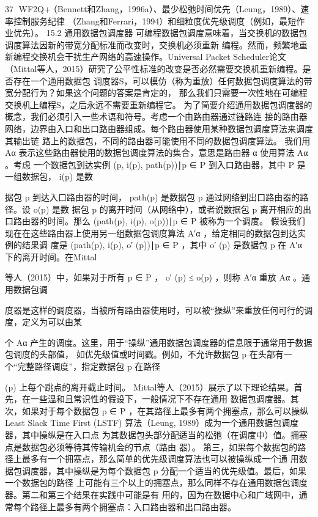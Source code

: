                                                     37
WF2Q+）（Bennett和Zhang，1996a）、最少松弛时间优先（Leung，1989）、速率控制服务纪律
（Zhang和Ferrari，1994）和细粒度优先级调度（例如，最短作业优先）。
15.2 通用数据包调度器
可编程数据包调度意味着，当交换机的数据包调度算法因新的带宽分配标准而改变时，交换机必须重新
编程。然而，频繁地重新编程交换机会干扰生产网络的高速操作。Universal Packet Scheduler论文
（Mittal等人，2015）研究了公平性标准的改变是否必然需要交换机重新编程。是否存在一个通用数据包
调度器S，可以模仿（称为重放）任何数据包调度算法的带宽分配行为？如果这个问题的答案是肯定的，
那么我们只需要一次性地在可编程交换机上编程S，之后永远不需要重新编程它。
为了简要介绍通用数据包调度器的概念，我们必须引入一些术语和符号。考虑一个由路由器通过链路连
接的路由器网络，边界由入口和出口路由器组成。每个路由器使用某种数据包调度算法来调度其输出链
路上的数据包，不同的路由器可能使用不同的数据包调度算法。
我们用 {Aα } 表示这些路由器使用的数据包调度算法的集合，意思是路由器 α 使用算法 Aα 。考虑
一个数据包到达实例 {(p, i(p), path(p))∣p ∈ P } 到入口路由器，其中 P 是一组数据包， i(p) 是数
          ​                                                          ​




据包 p 到达入口路由器的时间， path(p) 是数据包 p 通过网络到出口路由器的路径。设 o(p) 是数
据包 p 的离开时间（从网络中），或者说数据包 p 离开相应的出口路由器的时间。那么
 {(path(p), i(p), o(p))∣p ∈ P } 被称为一个调度。
假设我们现在在这些路由器上使用另一组数据包调度算法 {A′α } ，给定相同的数据包到达实例的结果调
度是 {(path(p), i(p), o′ (p))∣p ∈ P } ，其中 o′ (p) 是数据包 p 在 {A′α } 下的离开时间。在Mittal
                                              ​




等人（2015）中，如果对于所有 p ∈ P ， o′ (p) ≤ o(p) ，则称 {A′α } 重放 {Aα } 。通用数据包调
                                                         ​




度器是这样的调度器，当被所有路由器使用时，可以被“操纵”来重放任何可行的调度，定义为可以由某
                                                     ​         ​




个 {Aα } 产生的调度。这里，用于“操纵”通用数据包调度器的信息限于通常用于数据包调度的头部值，
如优先级值或时间戳。例如，不允许数据包 p 在头部有一个“完整路径调度”，指定数据包 p 在路径
      ​




 (p) 上每个跳点的离开截止时间。
Mittal等人（2015）展示了以下理论结果。首先，在一些温和且常识性的假设下，一般情况下不存在通用
数据包调度器。其次，如果对于每个数据包 p ∈ P ，在其路径上最多有两个拥塞点，那么可以操纵
Least Slack Time First (LSTF) 算法（Leung, 1989）成为一个通用数据包调度器，其中操纵是在入口点
为其数据包头部分配适当的松弛（在调度中）值。拥塞点是数据包必须等待其传输机会的节点（路由
器）。
第三，如果每个数据包的路径上最多有一个拥塞点，那么简单的优先级调度算法也可以被操纵成一个通
用数据包调度器，其中操纵是为每个数据包 p 分配一个适当的优先级值。最后，如果一个数据包的路径
上可能有三个以上的拥塞点，那么同样不存在通用数据包调度器。第二和第三个结果在实践中可能是有
用的，因为在数据中心和广域网中，通常每个路径上最多有两个拥塞点：入口路由器和出口路由器。

